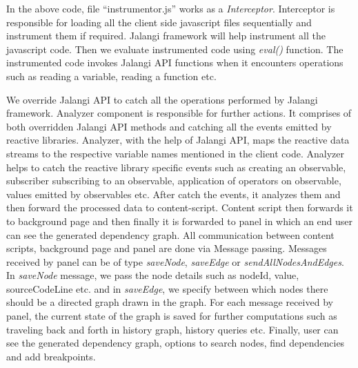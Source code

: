 In the above code, file ``instrumentor.js'' works as a \textit{Interceptor}. Interceptor is responsible for loading all the client side javascript files sequentially and instrument them if required. Jalangi framework will help instrument all the javascript code. Then we evaluate instrumented code using \textit{eval()} function. The instrumented code invokes Jalangi API functions when it encounters operations such as reading a variable, reading a function etc. 

We override Jalangi API to catch all the operations performed by Jalangi framework. Analyzer component is responsible for further actions. It comprises of both overridden Jalangi API methods and catching all the events emitted by reactive libraries. Analyzer, with the help of Jalangi API, maps the reactive data streams to the respective variable names mentioned in the client code. Analyzer helps to catch the reactive library specific events such as creating an observable, subscriber subscribing to an observable, application of operators on observable, values emitted by observables etc. After catch the events, it analyzes them and then forward the processed data to content-script. Content script then forwards it to background page and then finally it is forwarded to panel in which an end user can see the generated dependency graph. All communication between content scripts, background page and panel are done via Message passing. Messages received by panel can be of type \textit{saveNode}, \textit{saveEdge} or \textit{sendAllNodesAndEdges}. In \textit{saveNode} message, we pass the node details such as nodeId, value, sourceCodeLine etc. and in \textit{saveEdge}, we specify between which nodes there should be a directed graph drawn in the graph. For each message received by panel, the current state of the graph is saved for further computations such as traveling back and forth in history graph, history queries etc. Finally, user can see the generated dependency graph, options to search nodes, find dependencies and add breakpoints. 

